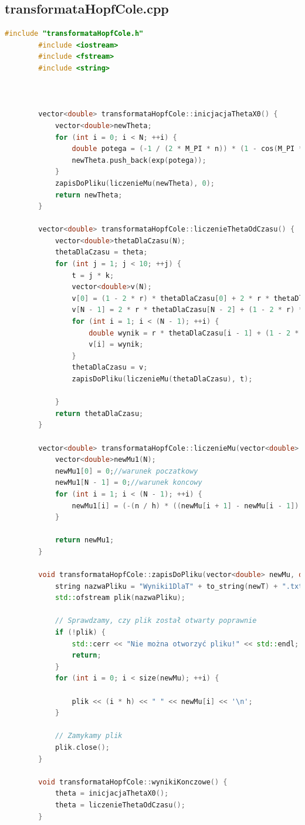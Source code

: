 \documentclass[a4paper,12pt]{article}
\begin{document}
	\subsection{transformataHopfCole.cpp}
	\begin{lstlisting}[caption={transformataHopfCole.cpp},label={transformataHopfColeCalyKod.cpp}, language=C++]
		#include "transformataHopfCole.h"
		#include <iostream>
		#include <fstream>
		#include <string>
		
		
		
		vector<double> transformataHopfCole::inicjacjaThetaX0() {
			vector<double>newTheta;
			for (int i = 0; i < N; ++i) {
				double potega = (-1 / (2 * M_PI * n)) * (1 - cos(M_PI * (i * h)));
				newTheta.push_back(exp(potega));
			}
			zapisDoPliku(liczenieMu(newTheta), 0);
			return newTheta;
		}
		
		vector<double> transformataHopfCole::liczenieThetaOdCzasu() {
			vector<double>thetaDlaCzasu(N);
			thetaDlaCzasu = theta;
			for (int j = 1; j < 10; ++j) {
				t = j * k;
				vector<double>v(N);
				v[0] = (1 - 2 * r) * thetaDlaCzasu[0] + 2 * r * thetaDlaCzasu[1]; //warunki brzegowe  
				v[N - 1] = 2 * r * thetaDlaCzasu[N - 2] + (1 - 2 * r) * thetaDlaCzasu[N - 1];
				for (int i = 1; i < (N - 1); ++i) {
					double wynik = r * thetaDlaCzasu[i - 1] + (1 - 2 * r) * thetaDlaCzasu[i] + r * thetaDlaCzasu[i + 1];
					v[i] = wynik;
				}
				thetaDlaCzasu = v;
				zapisDoPliku(liczenieMu(thetaDlaCzasu), t);
				
			}
			return thetaDlaCzasu;
		}
		
		vector<double> transformataHopfCole::liczenieMu(vector<double> newMu) {
			vector<double>newMu1(N);
			newMu1[0] = 0;//warunek poczatkowy
			newMu1[N - 1] = 0;//warunek koncowy
			for (int i = 1; i < (N - 1); ++i) {
				newMu1[i] = (-(n / h) * ((newMu[i + 1] - newMu[i - 1]) / newMu[i]));
			}
			
			return newMu1;
		}
		
		void transformataHopfCole::zapisDoPliku(vector<double> newMu, double newT) {
			string nazwaPliku = "Wyniki1DlaT" + to_string(newT) + ".txt";
			std::ofstream plik(nazwaPliku);
			
			// Sprawdzamy, czy plik został otwarty poprawnie
			if (!plik) {
				std::cerr << "Nie można otworzyć pliku!" << std::endl;
				return;
			}
			for (int i = 0; i < size(newMu); ++i) {
				
				plik << (i * h) << " " << newMu[i] << '\n';
			}
			
			// Zamykamy plik
			plik.close();
		}
		
		void transformataHopfCole::wynikiKonczowe() {
			theta = inicjacjaThetaX0();
			theta = liczenieThetaOdCzasu();
		}
		
	\end{lstlisting}
	
	
\end{document}
